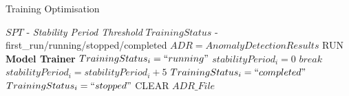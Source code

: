 \begin{algorithm}
\caption{Training Optimisation}
\label{raids_algorithm_training_optimiser}
\algnewcommand{}
\algnewcommand{}
\algnewcommand{}
\algnewcommand\INPUT{\item[\algorithmicinput]}
\algnewcommand\OUTPUT{\item[\algorithmicoutput]}
\algnewcommand\ABB{\item[\algorithmicabb]}

\begin{algorithmic}[1]
\INPUT $SPT$ - \textit{Stability Period Threshold}
 \OUTPUT $TrainingStatus$ - first\_run/running/stopped/completed
 \ABB 
$ADR = Anomaly Detection Results$
\Statex
\State RUN \textbf{Model Trainer}
\State $TrainingStatus_i = ``running"$
\State $stabilityPeriod_i = 0$
\State $break$
\Else 
\State $stabilityPeriod_i = stabilityPeriod_i + 5$
\EndIf
{}
\State $TrainingStatus_i = ``completed"$
\Else
\State $TrainingStatus_i = ``stopped"$
\EndIf
\State CLEAR $ADR\_File$
\EndIf
\EndFor
\end{algorithmic}
\end{algorithm}


